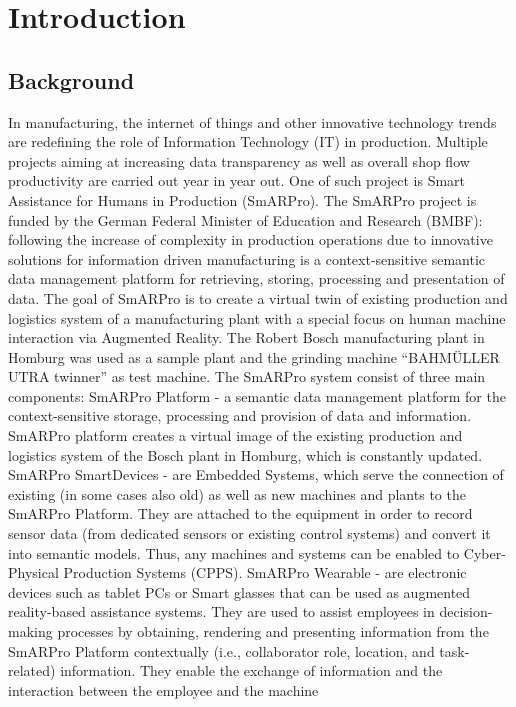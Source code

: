 \chapter{Introduction}

\section{Background}
In manufacturing, the internet of things and other innovative technology trends are redefining the role of Information Technology (IT) in production. Multiple projects aiming at increasing data transparency as well as overall shop flow productivity are carried out year in year out. One of such project is Smart Assistance for Humans in Production (SmARPro). The SmARPro project is funded by the German Federal Minister of Education and Research (BMBF): following the increase of complexity in production operations due to innovative solutions for information driven manufacturing  is a context-sensitive semantic data management platform for retrieving, storing, processing and presentation of data. The goal of SmARPro is to create a virtual twin of existing production and logistics system of a manufacturing plant with a special focus on human machine interaction via Augmented Reality. The Robert Bosch manufacturing plant in Homburg was used as a sample plant and the grinding machine “BAHMÜLLER UTRA twinner” as test machine. The SmARPro system consist of three main components: 
SmARPro Platform -  a semantic data management platform for the context-sensitive storage, processing and provision of data and information. SmARPro platform creates a virtual image of the existing production and logistics system of the Bosch plant in Homburg, which is constantly updated.
SmARPro SmartDevices - are Embedded Systems, which serve the connection of existing (in some cases also old) as well as new machines and plants to the SmARPro Platform. They are attached to the equipment in order to record sensor data (from dedicated sensors or existing control systems) and convert it into semantic models. Thus, any machines and systems can be enabled to Cyber-Physical Production Systems (CPPS).
SmARPro Wearable -  are electronic devices such as tablet PCs or Smart glasses that can be used as augmented reality-based assistance systems. They are used to assist employees in decision-making processes by obtaining, rendering and presenting information from the SmARPro Platform contextually (i.e., collaborator role, location, and task-related) information. They enable the exchange of information and the interaction between the employee and the machine

